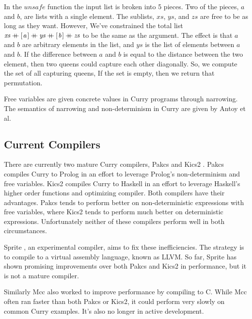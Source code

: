 \documentclass{book}
\theoremstyle{definition}
\newcommand{\Varid}[1]{\mathit{#1}}
\newcommand{\plus}{\mathbin{+\!\!\!+}}
\begin{document}
In the \ensuremath{\Varid{unsafe}} function the input list is broken into 5 pieces.
Two of the pieces, \ensuremath{\Varid{a}} and \ensuremath{\Varid{b}}, are lists with a single element.
The sublists, \ensuremath{\Varid{xs}}, \ensuremath{\Varid{ys}}, and \ensuremath{\Varid{zs}} are free to be as long as they want.
However, We've constrained the total list \ensuremath{\Varid{xs}\plus [\mskip1.5mu \Varid{a}\mskip1.5mu]\plus \Varid{ys}\plus [\mskip1.5mu \Varid{b}\mskip1.5mu]\plus \Varid{zs}}
to be the same as the argument.
The effect is that \ensuremath{\Varid{a}} and \ensuremath{\Varid{b}} are arbitrary elements in the list,
and \ensuremath{\Varid{ys}} is the list of elements between \ensuremath{\Varid{a}} and \ensuremath{\Varid{b}}.
If the difference between \ensuremath{\Varid{a}} and \ensuremath{\Varid{b}} is equal to the distance between
the two element, then two queens could capture each other diagonally.
So, we compute the set of all capturing queens,
If the set is empty, then we return that permutation.

Free variables are given concrete values in Curry programs through narrowing.
The semantics of narrowing and non-determinism in Curry are given by 
Antoy et al. \cite{Needed}

\subsection{Current Compilers}

There are currently two mature Curry compilers, Pakcs \cite{pakcs} and Kics2 \cite{kics2}.
Pakcs compiles Curry to Prolog in an effort to leverage Prolog's non-determinism and free variables.
Kics2 compiles Curry to Haskell in an effort to leverage Haskell's
higher order functions and optimizing compiler.
Both compilers have their advantages.
Pakcs tends to perform better on non-deterministic expressions with free variables,
where Kics2 tends to perform much better on deterministic expressions.
Unfortunately neither of these compilers perform well in both circumstances.

Sprite \cite{sprite}, an experimental compiler, aims to fix these inefficiencies.
The strategy is to compile to a virtual assembly language, known as LLVM.
So far, Sprite has shown promising improvements over both Pakcs and Kics2 in performance,
but it is not a mature compiler.

Similarly Mcc \cite{mcc} also worked to improve performance by compiling to C.
While Mcc often ran faster than both Pakcs or Kics2,
it could perform very slowly on common Curry examples.
It's also no longer in active development.
\end{document}
